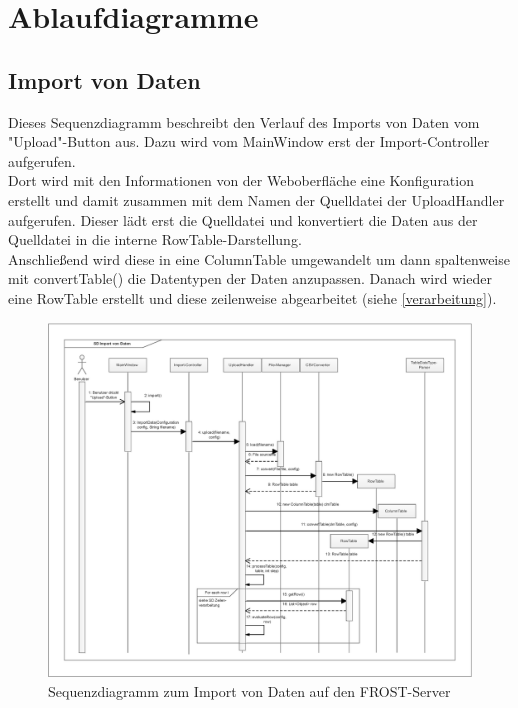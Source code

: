 \section{Ablaufdiagramme}

\subsection{Import von Daten}

Dieses Sequenzdiagramm beschreibt den Verlauf des Imports von Daten vom "{Upload}"{-Button} aus.
Dazu wird vom MainWindow erst der Import-Controller aufgerufen.\\
Dort wird mit den Informationen von der Weboberfläche eine Konfiguration erstellt und damit zusammen mit dem Namen der Quelldatei der UploadHandler aufgerufen.
Dieser lädt erst die Quelldatei und konvertiert die Daten aus der Quelldatei in die interne RowTable-Darstellung.\\
Anschließend wird diese in eine ColumnTable umgewandelt um dann spaltenweise mit convertTable() die Datentypen der Daten anzupassen.
Danach wird wieder eine RowTable erstellt und diese zeilenweise abgearbeitet (siehe \ref{verarbeitung}).
\vspace{\fill}
\begin{figure}[htbp]
\centering
\includegraphics[scale=0.45]{uml/eps/SD_upload.eps}
\caption{Sequenzdiagramm zum Import von Daten auf den FROST-Server}
\end{figure}
\vspace{\fill}


